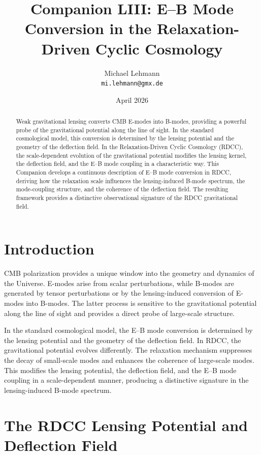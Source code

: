 \documentclass[11pt,a4paper]{article}
\title{\textbf{Companion LIII: E--B Mode Conversion in the Relaxation-Driven Cyclic Cosmology}}
\author{Michael Lehmann \\ \texttt{mi.lehmann@gmx.de}}
\date{April 2026}
\begin{document}
\maketitle

\begin{abstract}
Weak gravitational lensing converts CMB E-modes into B-modes, providing a powerful 
probe of the gravitational potential along the line of sight. In the standard 
cosmological model, this conversion is determined by the lensing potential and the 
geometry of the deflection field. In the Relaxation-Driven Cyclic Cosmology (RDCC), 
the scale-dependent evolution of the gravitational potential modifies the lensing 
kernel, the deflection field, and the E--B mode coupling in a characteristic way. 
This Companion develops a continuous description of E--B mode conversion in RDCC, 
deriving how the relaxation scale influences the lensing-induced B-mode spectrum, 
the mode-coupling structure, and the coherence of the deflection field. The 
resulting framework provides a distinctive observational signature of the RDCC 
gravitational field.
\end{abstract}
\section{Introduction}

CMB polarization provides a unique window into the geometry and dynamics of the 
Universe. E-modes arise from scalar perturbations, while B-modes are generated by 
tensor perturbations or by the lensing-induced conversion of E-modes into B-modes. 
The latter process is sensitive to the gravitational potential along the line of 
sight and provides a direct probe of large-scale structure.

In the standard cosmological model, the E--B mode conversion is determined by the 
lensing potential and the geometry of the deflection field. In RDCC, the 
gravitational potential evolves differently. The relaxation mechanism suppresses 
the decay of small-scale modes and enhances the coherence of large-scale modes. 
This modifies the lensing potential, the deflection field, and the E--B mode 
coupling in a scale-dependent manner, producing a distinctive signature in the 
lensing-induced B-mode spectrum.
\section{The RDCC Lensing Potential and Deflection Field}
\end{document}

